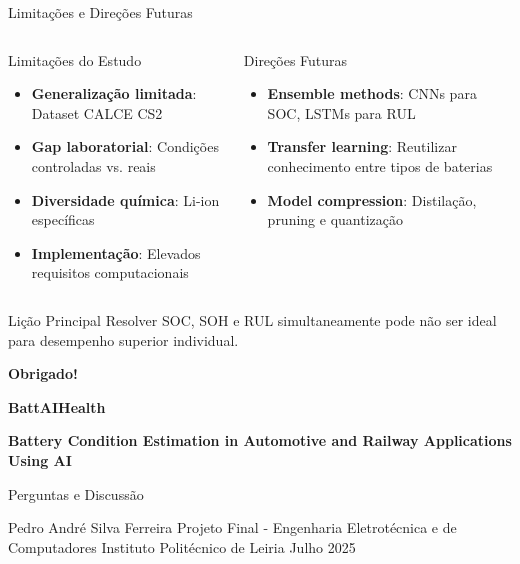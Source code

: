 \documentclass[aspectratio=169,xcolor=dvipsnames]{beamer}
\begin{document}
\begin{frame}{Limitações e Direções Futuras}
  \begin{columns}[T]
    \begin{column}{0.48\textwidth}
      \begin{alertblock}{Limitações do Estudo}
        \begin{itemize}
          \item \textbf{Generalização limitada}: Dataset CALCE CS2
          \item \textbf{Gap laboratorial}: Condições controladas vs. reais
          \item \textbf{Diversidade química}: Li-ion específicas
          \item \textbf{Implementação}: Elevados requisitos computacionais
        \end{itemize}
      \end{alertblock}
      
      \vspace{0.2cm}
      
      
    \end{column}
    \begin{column}{0.48\textwidth}
      \begin{exampleblock}{Direções Futuras}
        \begin{itemize}
          \item \textbf{Ensemble methods}: CNNs para SOC, LSTMs para RUL
          \item \textbf{Transfer learning}: Reutilizar conhecimento entre tipos de baterias
          \item \textbf{Model compression}: Distilação, pruning e quantização
        \end{itemize}
      \end{exampleblock}
    \end{column}
  \end{columns}
  \begin{block}{Lição Principal}
        \small
        Resolver SOC, SOH e RUL simultaneamente pode não ser ideal para desempenho superior individual.
      \end{block}
\end{frame}

\begin{frame}[plain]
  \centering
  \Huge \textbf{Obrigado!}
  
  \vspace{1cm}
  
  \Large \textbf{BattAIHealth}
  
  \normalsize
  \textbf{Battery Condition Estimation in Automotive and Railway Applications Using AI}
  
  \vspace{1cm}
  
  \normalsize
  Perguntas e Discussão
  
  \vspace{0.5cm}
  \small
  Pedro André Silva Ferreira
  Projeto Final - Engenharia Eletrotécnica e de Computadores
  Instituto Politécnico de Leiria
  Julho 2025
\end{frame}
\end{document}
